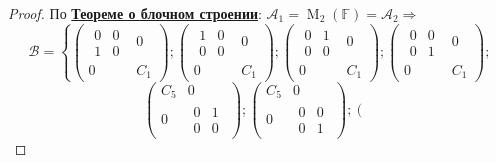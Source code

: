 \documentclass[a4paper, 14pt]{extarticle}
\theoremstyle{definition}
\begin{document}
\begin{proof}
	По \hyperref[th3_1]{\textbf{Теореме о блочном строении}}: \(\mathcal{A}_1 = \operatorname{M}_2(\mathbb{F}) = \mathcal{A}_2 \Rightarrow\)
	\[\mathcal{B} = \left\{
		\left(
			\begin{array}{c|c}
				\begin{array}{cc}
					0 & 0 \\
					1 & 0
				\end{array} & 0 \\
				\hline
				0 & C_1
			\end{array}
		\right);
		\left(
		\begin{array}{c|c}
			\begin{array}{cc}
				1 & 0 \\
				0 & 0
			\end{array} & 0 \\
			\hline
			0 & C_1
		\end{array}
		\right);
		\left(
		\begin{array}{c|c}
			\begin{array}{cc}
				0 & 1 \\
				0 & 0
			\end{array} & 0 \\
			\hline
			0 & C_1
		\end{array}
		\right);
		\left(
		\begin{array}{c|c}
			\begin{array}{cc}
				0 & 0 \\
				0 & 1
			\end{array} & 0 \\
			\hline
			0 & C_1
		\end{array}
		\right);
	\right.\]
	\[\left.
		\left(
			\begin{array}{c|c}
				C_5 & 0 \\
				\hline
				0 & \begin{array}{cc}
					0 & 1 \\
					0 & 0
				\end{array}
			\end{array}
		\right);
		\left(
		\begin{array}{c|c}
			C_5 & 0 \\
			\hline
			0 & \begin{array}{cc}
				0 & 0 \\
				0 & 1
			\end{array}
		\end{array}
		\right);
		\left(
		\begin{array}{c|c}

\end{array}\]
\end{proof}
\end{document}
